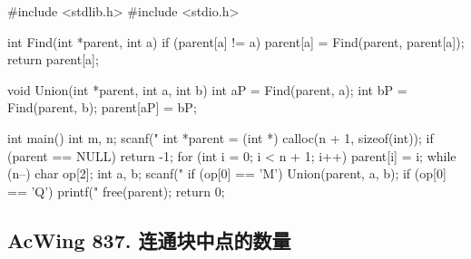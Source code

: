 \begin{mycpptwocol}[合并集合]
    #include <stdlib.h>
    #include <stdio.h>

    int Find(int *parent, int a)
        {
        if (parent[a] != a) {
            parent[a] = Find(parent, parent[a]);
        }
        return parent[a];
    }

    void Union(int *parent, int a, int b)
        {
        int aP = Find(parent, a);
        int bP = Find(parent, b);
        parent[aP] = bP;
    }

    int main()
        {
        int m, n;
        scanf("%
        int *parent = (int *) calloc(n + 1, sizeof(int));
        if (parent == NULL) {
            return -1;
        }
        for (int i = 0; i < n + 1; i++) {
            parent[i] = i;
        }
        while (n--) {
            char op[2];
            int a, b;
            scanf("%
            if (op[0] == 'M') {
                Union(parent, a, b);
            }
            if (op[0] == 'Q') {
                printf("%
            }
        }
        free(parent);
        return 0;
    }
\end{mycpptwocol}

\subsection{AcWing 837. 连通块中点的数量}

